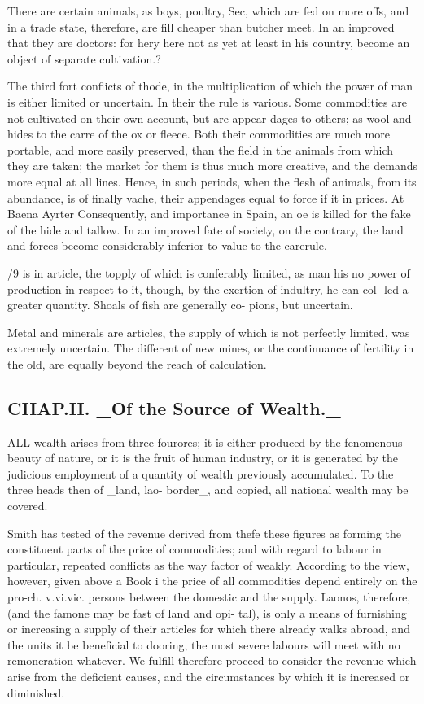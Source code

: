 There are certain animals, as boys, poultry, Sec, which are fed on more offs, and in a trade state, therefore, are fill cheaper than butcher meet. In an improved that they are doctors: for hery here not as yet at least in his country, become an object of separate cultivation.?\par\medskip
The third fort conflicts of thode, in the multiplication of which the power of man is either limited or uncertain. In their the rule is various. Some commodities are not cultivated on their own account, but are appear dages to others; as wool and hides to the carre of the ox or fleece. Both their commodities are much more portable, and more easily preserved, than the field in the animals from which they are taken; the market for them is thus much more creative, and the demands more equal at all lines. Hence, in such periods, when the flesh of animals, from its abundance, is of finally vache, their appendages equal to force if it in prices. At Baena Ayrter Consequently, and importance in Spain, an oe is killed for the fake of the hide and tallow. In an improved fate of society, on the contrary, the land and forces become considerably inferior to value to the carerule.\par{}/9 is in article, the topply of which is conferably limited, as man his no power of production in respect to it, though, by the exertion of indultry, he can col- led a greater quantity. Shoals of fish are generally co- pions, but uncertain.\par\medskip
Metal and minerals are articles, the supply of which is not perfectly limited, was extremely uncertain. The different of new mines, or the continuance of fertility in the old, are equally beyond the reach of calculation.\par\medskip
\subsection*{CHAP.II. \_Of the Source of Wealth.\_}
ALL wealth arises from three fourores; it is either produced by the fenomenous beauty of nature, or it is the fruit of human industry, or it is generated by the judicious employment of a quantity of wealth previously accumulated. To the three heads then of \_land, lao- border\_, and copied, all national wealth may be covered.\par\medskip
Smith has tested of the revenue derived from thefe these figures as forming the constituent parts of the price of commodities; and with regard to labour in particular, repeated conflicts as the way factor of weakly. According to the view, however, given above a Book i the price of all commodities depend entirely on the pro-ch. v.vi.vic. persons between the domestic and the supply. Laonos, therefore, (and the famone may be fast of land and opi- tal), is only a means of furnishing or increasing a supply of their articles for which there already walks abroad, and the units it be beneficial to dooring, the most severe labours will meet with no remoneration whatever. We fulfill therefore proceed to consider the revenue which arise from the deficient causes, and the circumstances by which it is increased or diminished.\par\medskip
